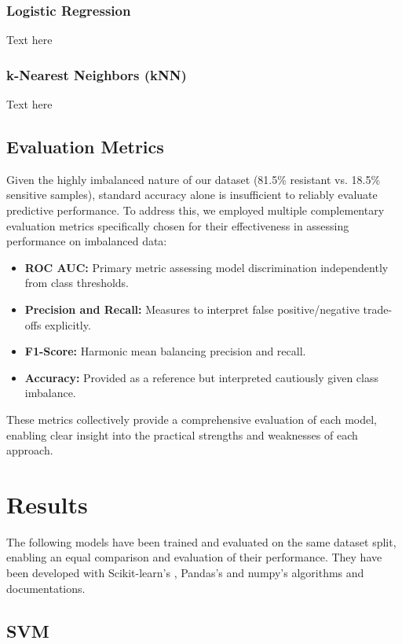 \documentclass{article}
\begin{document}
\subsubsection{Logistic Regression}
Text here

\subsubsection{k-Nearest Neighbors (kNN)}
Text here

\subsection{Evaluation Metrics}
Given the highly imbalanced nature of our dataset (81.5\% resistant vs. 18.5\% sensitive samples), standard accuracy alone is insufficient to reliably evaluate predictive performance. To address this, we employed multiple complementary evaluation metrics specifically chosen for their effectiveness in assessing performance on imbalanced data:
\begin{itemize}
    \item \textbf{ROC AUC:} Primary metric assessing model discrimination independently from class thresholds.
    \item \textbf{Precision and Recall:} Measures to interpret false positive/negative trade-offs explicitly.
    \item \textbf{F1-Score:} Harmonic mean balancing precision and recall.
    \item \textbf{Accuracy:} Provided as a reference but interpreted cautiously given class imbalance.
\end{itemize}
These metrics collectively provide a comprehensive evaluation of each model, enabling clear insight into the practical strengths and weaknesses of each approach.

\section{Results}

The following models have been trained and evaluated on the same dataset split, enabling an equal comparison and evaluation of their performance. They have been developed with Scikit-learn's \citep{scikit-learn}, Pandas's \citep{pandas} and numpy's \citep{numpy} algorithms and documentations. 

\subsection{SVM}
\end{document}
